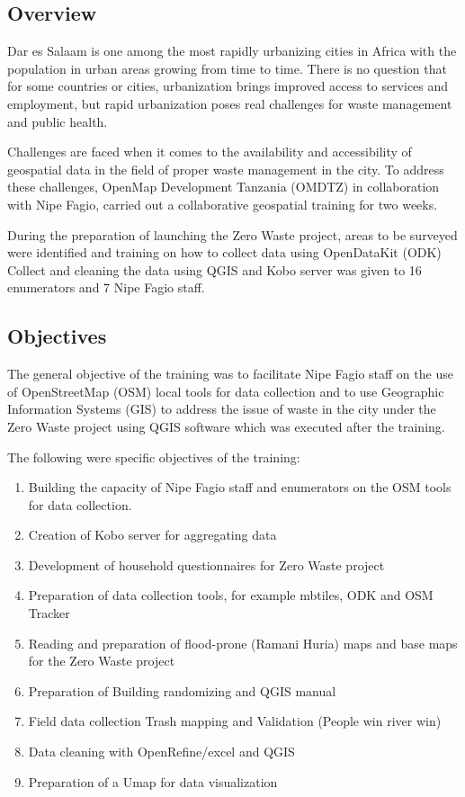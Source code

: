 \documentclass[a4paper,12pt,twoside]{article}
\begin{document}
\subsection{Overview}

    \begin{multicols}{2}
    Dar es Salaam is one among the most rapidly urbanizing cities in Africa with the population in urban areas growing from time to time. There is no question that for some countries or cities, urbanization brings improved access to services and employment, but rapid urbanization poses real challenges for waste management and public health.
    
    Challenges are faced when it comes to the availability and accessibility of geospatial data in the field of proper waste management in the city. To address these challenges, OpenMap Development Tanzania (OMDTZ) in collaboration with Nipe Fagio, carried out a collaborative geospatial training for two weeks. 
    
    During the preparation of launching the Zero Waste project, areas to be surveyed were identified and training on how to collect data using OpenDataKit (ODK) Collect and cleaning the data using QGIS and Kobo server was given to 16 enumerators and 7 Nipe Fagio staff. 
    \end{multicols}

\subsection{Objectives}
    The general objective of the training was to facilitate Nipe Fagio staff on the use of OpenStreetMap (OSM) local tools for data collection and to use Geographic Information Systems (GIS) to address the issue of waste in the city under the Zero Waste project using QGIS software which was executed after the training.

    
    The following were specific objectives of the training:
        
        \begin{enumerate} %
            \item Building the capacity of Nipe Fagio staff and enumerators on the OSM tools for data collection.
            \item Creation of Kobo server for aggregating data
            \item Development of household questionnaires for Zero Waste project
            \item Preparation of data collection tools, for example mbtiles, ODK and OSM Tracker 
            \item Reading and preparation of flood-prone (Ramani Huria) maps and base maps for the Zero Waste project
            \item Preparation of Building randomizing and QGIS manual
            \item Field data collection Trash mapping and Validation (People win river win)
            \item Data cleaning with OpenRefine/excel and QGIS
            \item Preparation of a Umap for data visualization
        \end{enumerate}
\end{document}
